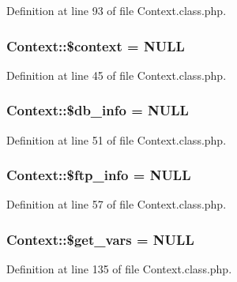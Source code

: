 Definition at line 93 of file Context.\-class.\-php.

\hypertarget{classContext_a39e9103dacbca5e5fa49d6e93f0ccec3}{
\subsubsection[{\$context}]{\setlength{\rightskip}{0pt plus 5cm}Context\-::\$context = N\-U\-L\-L}}\label{classContext_a39e9103dacbca5e5fa49d6e93f0ccec3}


Definition at line 45 of file Context.\-class.\-php.

\hypertarget{classContext_a6f4d307bdcb4bfd83fda27bc265977eb}{
\subsubsection[{\$db\-\_\-info}]{\setlength{\rightskip}{0pt plus 5cm}Context\-::\$db\-\_\-info = N\-U\-L\-L}}\label{classContext_a6f4d307bdcb4bfd83fda27bc265977eb}


Definition at line 51 of file Context.\-class.\-php.

\hypertarget{classContext_a8b9cb334c451f773d75db73b01f86ccc}{
\subsubsection[{\$ftp\-\_\-info}]{\setlength{\rightskip}{0pt plus 5cm}Context\-::\$ftp\-\_\-info = N\-U\-L\-L}}\label{classContext_a8b9cb334c451f773d75db73b01f86ccc}


Definition at line 57 of file Context.\-class.\-php.

\hypertarget{classContext_a587652913f4784dc8ad4a1cd4e3ee408}{
\subsubsection[{\$get\-\_\-vars}]{\setlength{\rightskip}{0pt plus 5cm}Context\-::\$get\-\_\-vars = N\-U\-L\-L}}\label{classContext_a587652913f4784dc8ad4a1cd4e3ee408}


Definition at line 135 of file Context.\-class.\-php.

